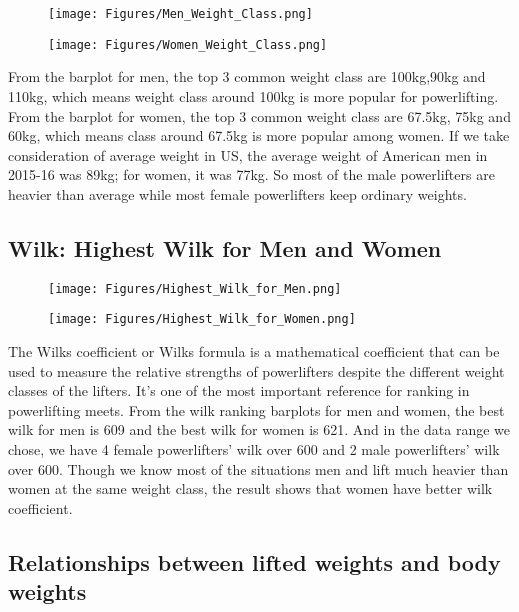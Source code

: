 \documentclass{article}
\begin{document}
	\begin{figure}[H]
	\centering
	\texttt{[image: Figures/Men\_Weight\_Class.png]}
	\end{figure}
	\begin{figure}[H]
	\centering
	\texttt{[image: Figures/Women\_Weight\_Class.png]}
	\end{figure}

From the barplot for men, the top 3 common weight class are 100kg,90kg and 110kg, which means weight class around 100kg is more popular for powerlifting. From the barplot for women, the top 3 common weight class are 67.5kg, 75kg and 60kg, which means class around 67.5kg is more popular among women. 
If we take consideration of average weight in US, the average weight of American men in 2015-16 was 89kg; for women, it was 77kg. So most of the male powerlifters are heavier than average while most female powerlifters keep ordinary weights.


\subsection{Wilk: Highest Wilk for Men and Women}

	\begin{figure}[H]
	\centering
	\texttt{[image: Figures/Highest\_Wilk\_for\_Men.png]}
	\end{figure}
	\begin{figure}[H]
	\centering
	\texttt{[image: Figures/Highest\_Wilk\_for\_Women.png]}
	\end{figure}

The Wilks coefficient or Wilks formula is a mathematical coefficient that can be used to measure the relative strengths of powerlifters despite the different weight classes of the lifters. It's one of the most important reference for ranking in powerlifting meets. From the wilk ranking barplots for men and women, the best wilk for men is 609 and the best wilk for women is 621. And in the data range we chose, we have 4 female powerlifters' wilk over 600 and 2 male powerlifters' wilk over 600.
Though we know most of the situations men and lift much heavier than women at the same weight class, the result shows that women have better wilk coefficient.

\subsection{Relationships between lifted weights and body weights}
\end{document}
